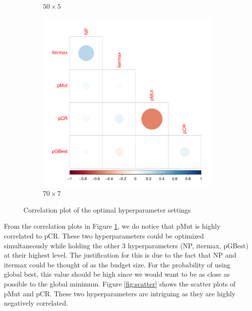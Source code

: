 \documentclass [PhD] {package/uclathes}
\begin{document}
\begin{figure}
\begin{subfigure}[b]{0.3\textwidth}
\caption{$50\times 5$}
\end{subfigure}
\begin{subfigure}[b]{0.3\textwidth}
\centering
\includegraphics{chapters/RSO/pdfs/corplot70_1}
\caption{$70\times 7$}
\end{subfigure}
\caption{Correlation plot of the optimal hyperparameter settings}
\label{fig:correlation}
\end{figure}

From the correlation plots in Figure \ref{fig:correlation}, we do notice that  pMut is highly correlated to pCR. These two hyperparameters could be optimized simultaneously while holding the other 3 hyperparameters (NP, itermax, pGBest) at their highest level. The justification for this is due to the fact that NP and  itermax could be thought of as the budget size. For the probability of using global best, this value should be high since we would want to be as close as possible to the global minimum. {Figure \ref{fig:scatter} shows the scatter plots of pMut and pCR. These two hyperparameters are intriguing as they are highly negatively correlated.} %
\end{document}
